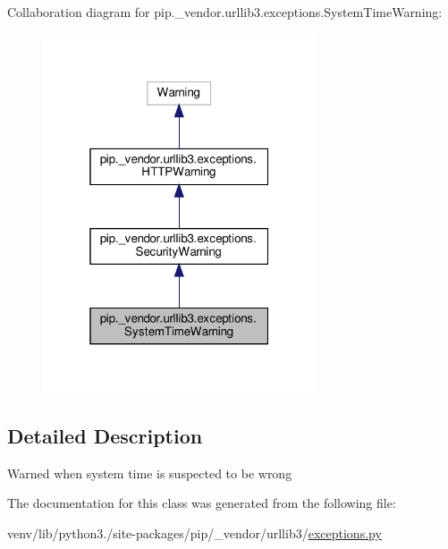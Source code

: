Collaboration diagram for pip.\+\_\+vendor.\+urllib3.\+exceptions.\+System\+Time\+Warning\+:
\nopagebreak
\begin{figure}[H]
\begin{center}
\leavevmode
\includegraphics[width=229pt]{classpip_1_1__vendor_1_1urllib3_1_1exceptions_1_1SystemTimeWarning__coll__graph}
\end{center}
\end{figure}


\subsection{Detailed Description}
\begin{DoxyVerb}Warned when system time is suspected to be wrong\end{DoxyVerb}
 

The documentation for this class was generated from the following file\+:\begin{DoxyCompactItemize}
\item 
venv/lib/python3./site-\/packages/pip/\+\_\+vendor/urllib3/\hyperlink{pip_2__vendor_2urllib3_2exceptions_8py}{exceptions.\+py}\end{DoxyCompactItemize}

